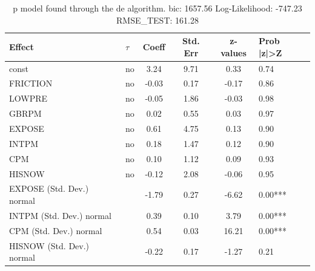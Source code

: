\begin{table}
	\caption{p model found through the de algorithm. bic: 1657.56 Log-Likelihood: -747.23 RMSE_TEST: 161.28}
	\begin{center}
		\begin{tabular}{|l|l|c|c|c|l|}
			\hline
			Effect & $\tau$ & Coeff & Std. Err & z-values & Prob |z|>Z \\
			\hline
			const & no & 3.24 & 9.71 & 0.33 & 0.74 \\
			\hline
			FRICTION & no & -0.03 & 0.17 & -0.17 & 0.86 \\
			\hline
			LOWPRE & no & -0.05 & 1.86 & -0.03 & 0.98 \\
			\hline
			GBRPM & no & 0.02 & 0.55 & 0.03 & 0.97 \\
			\hline
			EXPOSE & no & 0.61 & 4.75 & 0.13 & 0.90 \\
			\hline
			INTPM & no & 0.18 & 1.47 & 0.12 & 0.90 \\
			\hline
			CPM & no & 0.10 & 1.12 & 0.09 & 0.93 \\
			\hline
			HISNOW & no & -0.12 & 2.08 & -0.06 & 0.95 \\
			\hline
			EXPOSE (Std. Dev.) normal &  & -1.79 & 0.27 & -6.62 & 0.00*** \\
			\hline
			INTPM (Std. Dev.) normal &  & 0.39 & 0.10 & 3.79 & 0.00*** \\
			\hline
			CPM (Std. Dev.) normal &  & 0.54 & 0.03 & 16.21 & 0.00*** \\
			\hline
			HISNOW (Std. Dev.) normal &  & -0.22 & 0.17 & -1.27 & 0.21 \\
			\hline
		\end{tabular}
	\end{center}
\end{table}